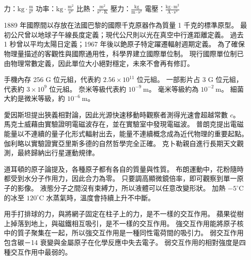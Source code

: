 \documentclass[10pt,a4paper]{article}
\begin{document}
{力：$\mathrm{kg}\cdot \frac{\mathrm{m}}{\mathrm{s}^2}$}
{功率：$\mathrm{kg}\cdot \frac{\mathrm{m}^2}{\mathrm{s}^3}$}
{比熱：$\frac{\mathrm{m}^2}{\mathrm{s}^2\cdot \mathrm{K}}$}
{壓力：$\frac{\mathrm{kg}}{\mathrm{m}\cdot \mathrm{s}^2}$}
{電壓：$\frac{\mathrm{kg}\cdot \mathrm{m}^2}{\mathrm{A}\cdot \mathrm{s}^3}$}

{1889 年國際間以存放在法國巴黎的國際千克原器作為質量 1 千克的標準原型。}
{最初公尺曾以地球子午線長度定義；現代公尺則以光在真空中行進距離定義。}
{過去 1 秒曾以平均太陽日定義；1967 年後以銫原子特定躍遷輻射週期定義。}
{為了確保物理量描述的客觀性與國際通用性，科學界建立國際單位制。}
{現行國際單位制已由物理常數定義，因此單位大小絕對穩定，未來不會再有修訂。}

{手機內存 256 G 位元組，代表約 $2.56\times 10^{11}$ 位元組。}
{一部影片占 3 G 位元組，代表約 $3\times 10^9$ 位元組。}
{奈米等級代表約 $10^{-9}\ \mathrm{m}$。}
{毫米等級約為 $10^{-2}\ \mathrm{m}$。}
{細菌大約是微米等級，約 $10^{-6}\ \mathrm{m}$。}

{愛因斯坦提出狹義相對論，因此光源快速移動時觀察者測得光速會超越常數 $c$。}
{馬克士威藉由實驗證明電磁波存在，並在實驗室中發現電磁波。}
{普朗克提出電磁能量以不連續的量子化形式輻射出去，能量不連續概念成為近代物理的重要起點。}
{伽利略以實驗證實亞里斯多德的自然哲學完全正確。}
{克卜勒親自進行長期天文觀測，最終歸納出行星運動規律。}


{道耳頓的原子論提及，各種原子都有各自的質量與性質。}
{布朗運動中，花粉隨時都受到水分子作用力，因此合力為零。}
{只要調高顯微鏡倍率，即可觀察到單一原子的影像。}
{液態分子之間沒有束縛力，所以液體可以任意改變形狀。}
{加熱 $-5^\circ\mathrm{C}$ 的冰至 $120^\circ\mathrm{C}$ 水蒸氣時，溫度會持續上升不中斷。}

{用手打排球的力，與將網子固定在柱子上的力，是不一樣的交互作用。}
{蘋果從樹上掉落到地上，與磁鐵相互吸引，是不一樣的交互作用。}
{強交互作用能將原子核中的質子聚集在一起，所以強交互作用是一種同性電荷間的吸引力。}
{弱交互作用包含碳－14 衰變與金屬原子在化學反應中失去電子。}
{弱交互作用的相對強度是四種交互作用中最弱的。}


\end{document}
